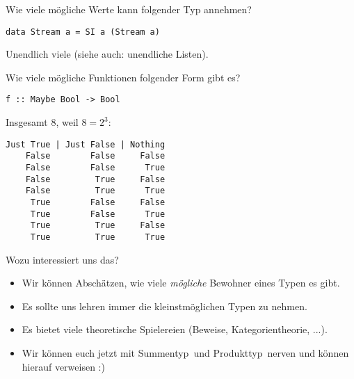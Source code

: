 \documentclass{beamer}
\begin{document}
\begin{frame}[fragile]
Wie viele mögliche Werte kann folgender Typ annehmen?
\begin{verbatim}
data Stream a = SI a (Stream a)
\end{verbatim}
\pause
\bigskip

Unendlich viele (siehe auch: unendliche Listen).
\end{frame}

\begin{frame}[fragile]
Wie viele mögliche Funktionen folgender Form gibt es?
\begin{verbatim}
f :: Maybe Bool -> Bool
\end{verbatim}
\pause
\bigskip

Insgesamt 8, weil $8 = 2^3$:
\begin{verbatim}
Just True | Just False | Nothing
    False        False     False
    False        False      True
    False         True     False
    False         True      True
     True        False     False
     True        False      True
     True         True     False
     True         True      True
\end{verbatim}
\end{frame}

\begin{frame}[fragile]
Wozu interessiert uns das?
\pause
\begin{itemize}
 \item Wir können Abschätzen, wie viele \textit{mögliche} Bewohner eines Typen es gibt. \pause
 \item Es sollte uns lehren immer die kleinstmöglichen Typen zu nehmen. \pause
 \item Es bietet viele theoretische Spielereien (Beweise, Kategorientheorie, ...). \pause
 \pause
 \item Wir können euch jetzt mit \glqq Summentyp\grqq \ und \glqq Produkttyp\grqq\ nerven und können hierauf verweisen :)
\end{itemize}

\end{frame}

\end{document}

